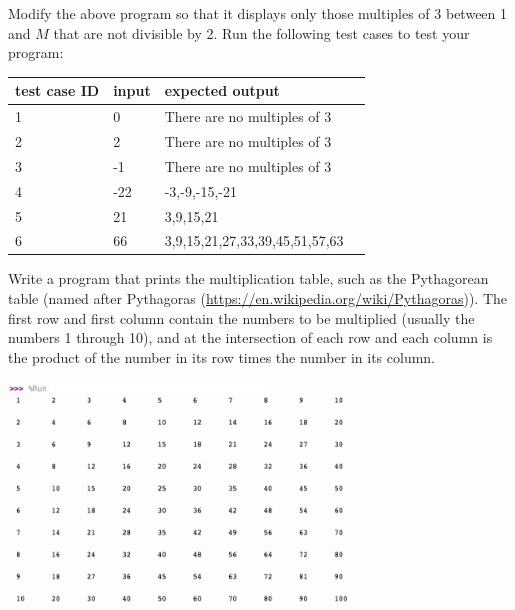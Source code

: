 \begin{exercise} 
Modify the above program so that it displays only those multiples of 3 between 1 and $M$ that are not divisible by 2. Run the following test cases to test your program:

\begin{tabular}{|l|l|l|l|}
\hline
test case ID  & input & expected output  \\ 
\hline\hline
1 & 0 & There are no multiples of 3\\
2 & 2 & There are no multiples of 3\\
3 & -1 & There are no multiples of 3\\
4 & -22 & -3,-9,-15,-21\\
5 & 21 & 3,9,15,21\\
6 & 66 & 3,9,15,21,27,33,39,45,51,57,63\\
\hline
\end{tabular}
\end{exercise}


\begin{exercise}
Write a program that prints the multiplication table, such as the Pythagorean table (named after Pythagoras (\url{https://en.wikipedia.org/wiki/Pythagoras})). The first row and first column contain the numbers to be multiplied (usually the numbers 1 through 10), and at the intersection of each row and each column is the product of the number in its row times the number in its column.


\includegraphics[width=0.75\textwidth]{images/pitagoras.png}
  

\end{exercise}


